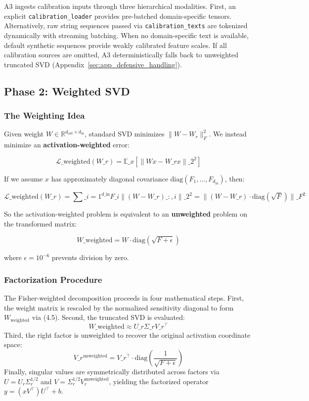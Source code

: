 A3 ingests calibration inputs through three hierarchical modalities. First, an explicit \texttt{calibration\_loader} provides pre-batched domain-specific tensors. Alternatively, raw string sequences passed via \texttt{calibration\_texts} are tokenized dynamically with streaming batching. When no domain-specific text is available, default synthetic sequences provide weakly calibrated feature scales. If all calibration sources are omitted, A3 deterministically falls back to unweighted truncated SVD (Appendix~\ref{sec:app_defensive_handling}).

\subsection{Phase 2: Weighted SVD}
\label{sec:fisher_weighted_svd}

\subsubsection{The Weighting Idea}

Given weight $W \in \mathbb{R}^{d_\text{out} \times d_\text{in}}$, standard 
SVD minimizes $\|W - W_r\|_F^2$. We instead minimize an \textbf{activation-weighted} 
error:

\[
\mathcal{L}\_\text{weighted}(W\_r) = \mathbb{E}\_x\!\left[\|W x - W\_r x\|\_2^2\right]
\tag{4.3}
\]

If we assume $x$ has approximately diagonal covariance 
$\mathrm{diag}(F_1, \dots, F_{d_\text{in}})$, then:

\[
\mathcal{L}\_\text{weighted}(W\_r) = \sum\_{i=1}^{d\_\text{in}} F\_i \|(W - W\_r)\_{:, i}\|\_2^2 = \|(W - W\_r) \cdot \mathrm{diag}(\sqrt{F})\|\_F^2
\tag{4.4}
\]

So the activation-weighted problem is equivalent to an \textbf{unweighted} problem 
on the transformed matrix:

\[
W\_\text{weighted} = W \cdot \mathrm{diag}(\sqrt{F + \epsilon})
\tag{4.5}
\]

where $\epsilon = 10^{-6}$ prevents division by zero.

\subsubsection{Factorization Procedure}

The Fisher-weighted decomposition proceeds in four mathematical steps. First, the weight matrix is rescaled by the normalized sensitivity diagonal to form $W_\text{weighted}$ via (4.5). Second, the truncated SVD is evaluated:
\[
W\_\text{weighted} \approx U\_r \Sigma\_r V\_r^\top
\tag{4.6}
\]
Third, the right factor is unweighted to recover the original activation coordinate space:
\[
V\_r^\text{unweighted} = V\_r^\top \cdot \mathrm{diag}\left(\frac{1}{\sqrt{F + \epsilon}}\right)
\tag{4.7}
\]
Finally, singular values are symmetrically distributed across factors via $U = U_r \Sigma_r^{1/2}$ and $V = \Sigma_r^{1/2} V_r^\text{unweighted}$, yielding the factorized operator $y = (x V^\top) U^\top + b$.

